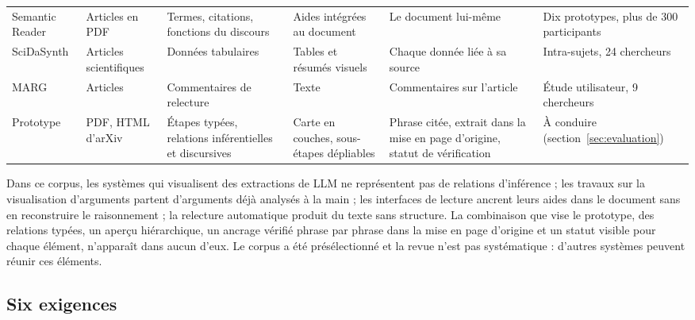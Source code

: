 \begin{table}[ht]
\begin{tabularx}{\textwidth}{@{}>{\raggedright\arraybackslash}p{2.7cm}LLLLL@{}}
Semantic Reader\newline\parencite{ref15} & Articles en PDF & Termes, citations, fonctions du discours & Aides intégrées au document & Le document lui-même & Dix prototypes, plus de 300 participants \\
SciDaSynth\newline\parencite{ref16} & Articles scientifiques & Données tabulaires & Tables et résumés visuels & Chaque donnée liée à sa source & Intra-sujets, 24 chercheurs \\
MARG\newline\parencite{ref19} & Articles & Commentaires de relecture & Texte & Commentaires sur l’article & Étude utilisateur, 9 chercheurs \\
\addlinespace
Prototype & PDF, HTML d’arXiv & Étapes typées, relations inférentielles et discursives & Carte en couches, sous-étapes dépliables & Phrase citée, extrait dans la mise en page d’origine, statut de vérification & À conduire (section~\ref{sec:evaluation}) \\
\bottomrule
\end{tabularx}
\end{table}

Dans ce corpus, les systèmes qui visualisent des extractions de LLM ne représentent pas de relations d’inférence ; les travaux sur la visualisation d’arguments partent d’arguments déjà analysés à la main ; les interfaces de lecture ancrent leurs aides dans le document sans en reconstruire le raisonnement ; la relecture automatique produit du texte sans structure. La combinaison que vise le prototype, des relations typées, un aperçu hiérarchique, un ancrage vérifié phrase par phrase dans la mise en page d’origine et un statut visible pour chaque élément, n’apparaît dans aucun d’eux. Le corpus a été présélectionné et la revue n’est pas systématique : d’autres systèmes peuvent réunir ces éléments.

\subsection{Six exigences}

